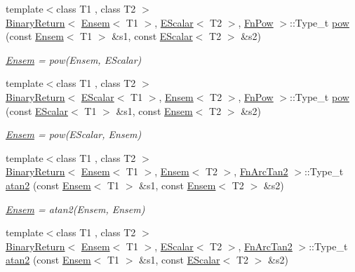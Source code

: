\begin{DoxyCompactItemize}
{\footnotesize template$<$class T1 , class T2 $>$ }\\\mbox{\hyperlink{structENSEM_1_1BinaryReturn}{Binary\+Return}}$<$ \mbox{\hyperlink{classENSEM_1_1Ensem}{Ensem}}$<$ T1 $>$, \mbox{\hyperlink{classENSEM_1_1EScalar}{E\+Scalar}}$<$ T2 $>$, \mbox{\hyperlink{structENSEM_1_1FnPow}{Fn\+Pow}} $>$\+::Type\+\_\+t \mbox{\hyperlink{group__eensem_ga56e0a919e0060bdb32e0b2aa9ea97f11}{pow}} (const \mbox{\hyperlink{classENSEM_1_1Ensem}{Ensem}}$<$ T1 $>$ \&s1, const \mbox{\hyperlink{classENSEM_1_1EScalar}{E\+Scalar}}$<$ T2 $>$ \&s2)
\begin{DoxyCompactList}\small\item\em \mbox{\hyperlink{classENSEM_1_1Ensem}{Ensem}} = pow(\+Ensem, E\+Scalar) \end{DoxyCompactList}\item 
{\footnotesize template$<$class T1 , class T2 $>$ }\\\mbox{\hyperlink{structENSEM_1_1BinaryReturn}{Binary\+Return}}$<$ \mbox{\hyperlink{classENSEM_1_1EScalar}{E\+Scalar}}$<$ T1 $>$, \mbox{\hyperlink{classENSEM_1_1Ensem}{Ensem}}$<$ T2 $>$, \mbox{\hyperlink{structENSEM_1_1FnPow}{Fn\+Pow}} $>$\+::Type\+\_\+t \mbox{\hyperlink{group__eensem_gae3b272ae394d114d478f320d24ca05df}{pow}} (const \mbox{\hyperlink{classENSEM_1_1EScalar}{E\+Scalar}}$<$ T1 $>$ \&s1, const \mbox{\hyperlink{classENSEM_1_1Ensem}{Ensem}}$<$ T2 $>$ \&s2)
\begin{DoxyCompactList}\small\item\em \mbox{\hyperlink{classENSEM_1_1Ensem}{Ensem}} = pow(\+E\+Scalar, Ensem) \end{DoxyCompactList}\item 
{\footnotesize template$<$class T1 , class T2 $>$ }\\\mbox{\hyperlink{structENSEM_1_1BinaryReturn}{Binary\+Return}}$<$ \mbox{\hyperlink{classENSEM_1_1Ensem}{Ensem}}$<$ T1 $>$, \mbox{\hyperlink{classENSEM_1_1Ensem}{Ensem}}$<$ T2 $>$, \mbox{\hyperlink{structENSEM_1_1FnArcTan2}{Fn\+Arc\+Tan2}} $>$\+::Type\+\_\+t \mbox{\hyperlink{group__eensem_ga4a9f9b7400c5d7cbbb6f6118ca6a3c47}{atan2}} (const \mbox{\hyperlink{classENSEM_1_1Ensem}{Ensem}}$<$ T1 $>$ \&s1, const \mbox{\hyperlink{classENSEM_1_1Ensem}{Ensem}}$<$ T2 $>$ \&s2)
\begin{DoxyCompactList}\small\item\em \mbox{\hyperlink{classENSEM_1_1Ensem}{Ensem}} = atan2(\+Ensem, Ensem) \end{DoxyCompactList}\item 
{\footnotesize template$<$class T1 , class T2 $>$ }\\\mbox{\hyperlink{structENSEM_1_1BinaryReturn}{Binary\+Return}}$<$ \mbox{\hyperlink{classENSEM_1_1Ensem}{Ensem}}$<$ T1 $>$, \mbox{\hyperlink{classENSEM_1_1EScalar}{E\+Scalar}}$<$ T2 $>$, \mbox{\hyperlink{structENSEM_1_1FnArcTan2}{Fn\+Arc\+Tan2}} $>$\+::Type\+\_\+t \mbox{\hyperlink{group__eensem_gabe797638db840fa2cddca1e1d133fc55}{atan2}} (const \mbox{\hyperlink{classENSEM_1_1Ensem}{Ensem}}$<$ T1 $>$ \&s1, const \mbox{\hyperlink{classENSEM_1_1EScalar}{E\+Scalar}}$<$ T2 $>$ \&s2)

\end{DoxyCompactItemize}
